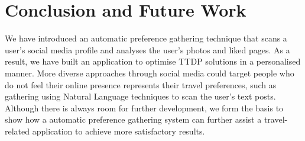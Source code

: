 
\section{Conclusion and Future Work}

We have introduced an automatic preference gathering technique that scans a
user's social media profile and analyses the user's photos and liked pages. As
a result, we have built an application to optimise TTDP solutions in a
personalised manner. More diverse approaches through social media could target
people who do not feel their online presence represents their travel preferences,
such as gathering using Natural Language techniques to scan the user's
text posts. Although there is always room for further development, we form
the basis to show how a automatic preference gathering system can further
assist a travel-related application to achieve more satisfactory results.
